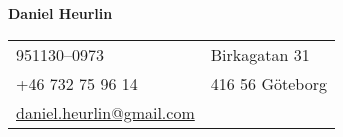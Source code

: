 \documentclass[letterpaper,11pt,oneside]{article}
\begin{document}

\noindent  \LARGE{\textbf{Daniel Heurlin}}  \\
\vspace{-2ex}
\toprule
\normalsize


\begin{center}
\begin{tabular}{l l}
 951130–0973      & \hspace{1in}  Birkagatan 31 \\ 
 +46 732 75 96 14 & \hspace{1in}  416 56 Göteborg \\ 
 \href{mailto:daniel.heurlin@gmail.com}{daniel.heurlin@gmail.com} &
\end{tabular}
\end{center}

\vspace{1em}

\end{document}
